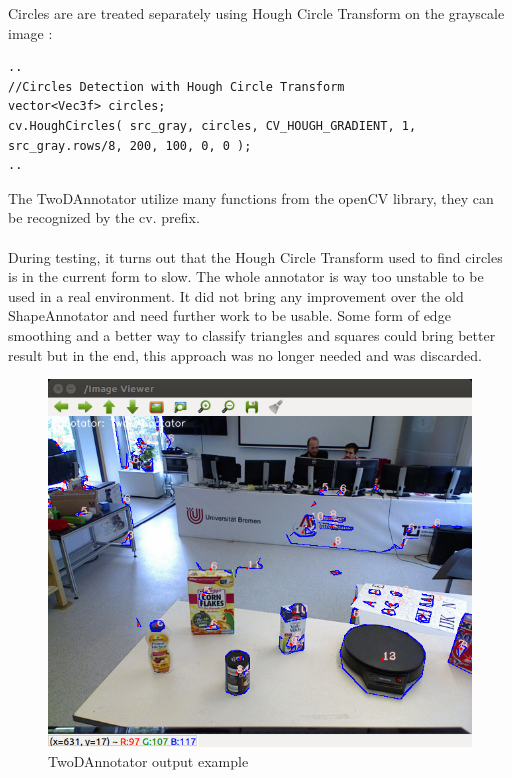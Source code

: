 \documentclass[main.tex]{subfiles}
\begin{document}
Circles are are treated separately using Hough Circle Transform on the grayscale image : 

\begin{lstlisting}
..
//Circles Detection with Hough Circle Transform
vector<Vec3f> circles;
cv.HoughCircles( src_gray, circles, CV_HOUGH_GRADIENT, 1, src_gray.rows/8, 200, 100, 0, 0 );
..
\end{lstlisting}

The TwoDAnnotator utilize many functions from the openCV library, they can be recognized by the cv. prefix. \\ \\
During testing, it turns out that the Hough Circle Transform used to find circles is in the current form to slow. The whole annotator is way too unstable to be used in a real environment. It did not bring any improvement over the old ShapeAnnotator and need further work to be usable. Some form of edge smoothing and a better way to classify triangles and squares could bring better result but in the end, this approach was no longer needed and was discarded.
\begin{figure}[H]
\centering
\includegraphics[width=1\textwidth]{pictures/perception/TwoDAnnotator.png}
\caption{TwoDAnnotator output example}
\end{figure}
\end{document}
